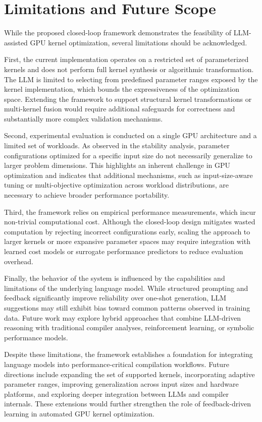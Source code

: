 \documentclass{article}
\begin{document}
\section{Limitations and Future Scope}

While the proposed closed-loop framework demonstrates the feasibility of LLM-assisted GPU kernel optimization, several limitations should be acknowledged.

First, the current implementation operates on a restricted set of parameterized kernels and does not perform full kernel synthesis or algorithmic transformation. The LLM is limited to selecting from predefined parameter ranges exposed by the kernel implementation, which bounds the expressiveness of the optimization space. Extending the framework to support structural kernel transformations or multi-kernel fusion would require additional safeguards for correctness and substantially more complex validation mechanisms.

Second, experimental evaluation is conducted on a single GPU architecture and a limited set of workloads. As observed in the stability analysis, parameter configurations optimized for a specific input size do not necessarily generalize to larger problem dimensions. This highlights an inherent challenge in GPU optimization and indicates that additional mechanisms, such as input-size-aware tuning or multi-objective optimization across workload distributions, are necessary to achieve broader performance portability.

Third, the framework relies on empirical performance measurements, which incur non-trivial computational cost. Although the closed-loop design mitigates wasted computation by rejecting incorrect configurations early, scaling the approach to larger kernels or more expansive parameter spaces may require integration with learned cost models or surrogate performance predictors to reduce evaluation overhead.

Finally, the behavior of the system is influenced by the capabilities and limitations of the underlying language model. While structured prompting and feedback significantly improve reliability over one-shot generation, LLM suggestions may still exhibit bias toward common patterns observed in training data. Future work may explore hybrid approaches that combine LLM-driven reasoning with traditional compiler analyses, reinforcement learning, or symbolic performance models.

Despite these limitations, the framework establishes a foundation for integrating language models into performance-critical compilation workflows. Future directions include expanding the set of supported kernels, incorporating adaptive parameter ranges, improving generalization across input sizes and hardware platforms, and exploring deeper integration between LLMs and compiler internals. These extensions would further strengthen the role of feedback-driven learning in automated GPU kernel optimization.
\end{document}
